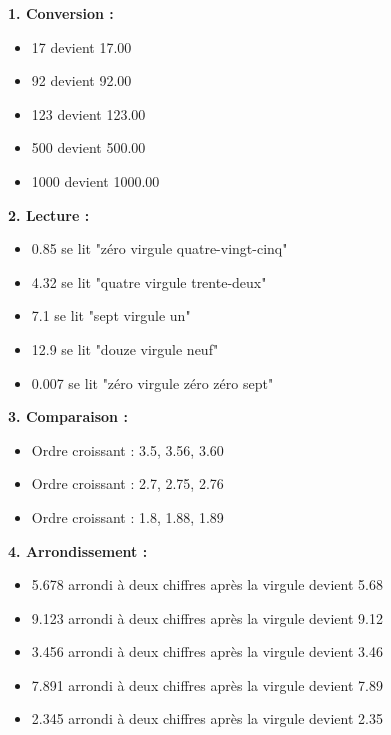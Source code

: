 \documentclass{article}
\begin{document}
\begin{tcolorbox}[colback=green!10!white, colframe=green!75!black, sharp corners=south, boxrule=0.8mm, title=Corrections]
    \textbf{1. Conversion :}
    \begin{itemize}
        \item 17 devient 17.00
        \item 92 devient 92.00
        \item 123 devient 123.00
        \item 500 devient 500.00
        \item 1000 devient 1000.00
    \end{itemize}

    \textbf{2. Lecture :}
    \begin{itemize}
        \item 0.85 se lit "zéro virgule quatre-vingt-cinq"
        \item 4.32 se lit "quatre virgule trente-deux"
        \item 7.1 se lit "sept virgule un"
        \item 12.9 se lit "douze virgule neuf"
        \item 0.007 se lit "zéro virgule zéro zéro sept"
    \end{itemize}

    \textbf{3. Comparaison :}
    \begin{itemize}
        \item Ordre croissant : 3.5, 3.56, 3.60
        \item Ordre croissant : 2.7, 2.75, 2.76
        \item Ordre croissant : 1.8, 1.88, 1.89
    \end{itemize}

    \textbf{4. Arrondissement :}
    \begin{itemize}
        \item 5.678 arrondi à deux chiffres après la virgule devient 5.68
        \item 9.123 arrondi à deux chiffres après la virgule devient 9.12
        \item 3.456 arrondi à deux chiffres après la virgule devient 3.46
        \item 7.891 arrondi à deux chiffres après la virgule devient 7.89
        \item 2.345 arrondi à deux chiffres après la virgule devient 2.35
    \end{itemize}


\end{tcolorbox}
\end{document}
